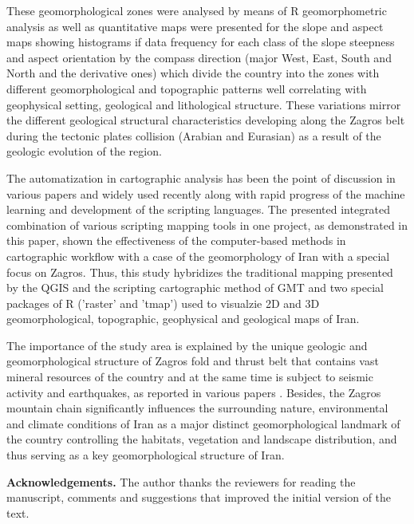 \documentclass[12pt,a4paper,oneside]{article}
\begin{document}
These geomorphological zones were analysed by means of R geomorphometric analysis as well as quantitative maps were presented for the slope and aspect maps showing histograms if data frequency for each class of the slope steepness and aspect orientation by the compass direction (major West, East, South and North and the derivative ones) which divide the country into the zones with different geomorphological and topographic patterns well correlating with geophysical setting, geological and lithological structure. These variations mirror the different geological structural characteristics developing along the Zagros belt during the tectonic plates collision (Arabian and Eurasian) as a result of the geologic evolution of the region. 

The automatization in cartographic analysis has been the point of discussion in various papers \cite{Schenke,Lemenkova2014d,Lemenkova2019c,Gauger} and widely used recently along with rapid progress of the machine learning and development of the scripting languages. The presented integrated combination of various scripting mapping tools in one project, as demonstrated in this paper, shown the effectiveness of the computer-based methods in cartographic workflow with a case of the geomorphology of Iran with a special focus on Zagros. Thus, this study hybridizes the traditional mapping presented by the QGIS and the scripting cartographic method of GMT and two special packages of R ('raster' and 'tmap') used to visualzie 2D and 3D geomorphological, topographic,  geophysical and geological maps of Iran. 

The importance of the study area is explained by the unique geologic and geomorphological structure of Zagros fold and thrust belt that contains vast mineral resources of the country \cite{Sepehr,Regard,Motaghi2017,Saura} and at the same time is subject to seismic activity and earthquakes, as reported in various papers \cite{Paul,Nissen,Yamini,Tavakoli,Talebian}. Besides, the Zagros mountain chain significantly influences the surrounding nature, environmental and climate conditions of Iran as a major distinct geomorphological landmark of the country controlling the habitats, vegetation and landscape distribution, and thus serving as a key geomorphological structure of Iran. 


{\bf Acknowledgements.} The author thanks the reviewers for reading the manuscript, comments and suggestions that improved the initial version of the text.
\end{document}
